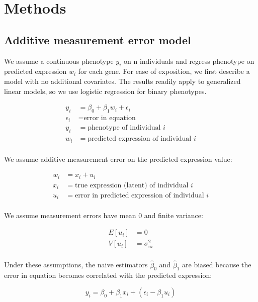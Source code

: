 \documentclass[11pt]{article}
\begin{document}
\section{Methods}

\subsection{Additive measurement error model}

We assume a continuous phenotype \(y_i\) on n individuals and regress phenotype
on predicted expression \(w_i\) for each gene. For ease of exposition, we first
describe a model with no additional covariates. The results readily apply to
generalized linear models, so we use logistic regression for binary phenotypes.

\begin{align*}
  y_i &= \beta_0 + \beta_1 w_i + \epsilon_i\\
  \epsilon_i &= \text{error in equation}\\
  y_i &= \text{phenotype of individual $i$}\\
  w_i &= \text{predicted expression of individual $i$}\\
\end{align*}

We assume additive measurement error on the predicted expression value:

\begin{align*}
  w_i &= x_i + u_i\\
  x_i &= \text{true expression (latent) of individual $i$}\\
  u_i &= \text{error in predicted expression of individual $i$}\\
\end{align*}

We assume measurement errors have mean 0 and finite variance:

\begin{align*}
  E[u_i] &= 0\\
  V[u_i] &= \sigma_{ui}^2\\
\end{align*}

Under these assumptions, the naive estimators \(\hat\beta_0\) and \(\hat\beta_1\)
are biased because the error in equation becomes correlated with the predicted
expression:

\begin{equation}
  y_i = \beta_0 + \beta_1 x_i + (\epsilon_i - \beta_1 u_i)
\end{equation}
\end{document}
